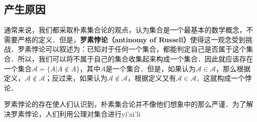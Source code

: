 \begin{issues}
\issueTODO
\end{issues}


\subsection{产生原因}
通常来说，我们都采取朴素集合论的观点，认为集合是一个最基本的数学概念，不需要严格的定义．但是，\textbf{罗素悖论（antinomy of Russell）}使得这一观念受到挑战．罗素悖论可以叙述为：已知对于任何一个集合，都能判定自己是否属于这个集合．所以，我们可以将不属于自己的集合收集起来构成一个集合．因此就应该存在一个集合$\mathcal{A}=\{A|A\notin A\}$，其中$A$是一个集合．但是，如果认为$\mathcal{A}\in\mathcal{A}$，那么根据定义，$\mathcal{A}\notin\mathcal{A}$；反过来，如果认为$\mathcal{A}\notin\mathcal{A}$，根据定义又有$\mathcal{A}\in\mathcal{A}$．这就构成一个悖论．

罗素悖论的存在使人们认识到，朴素集合论并不像他们想象中的那么严谨．为了解决罗素悖论，人们利用公理对集合进行yi'xi'li

